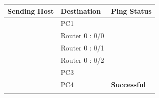 \documentclass[a4paper,11pt]{article}
\begin{document}
\begin{enumerate}
\begin{table}[H]
              \begin{tabular}{| m{10em}| m{15em}| m{10em} |}
                  \hline
                  \multicolumn{1}{|l|}{\textbf{Sending Host}}                     & \textbf{Destination} & \multicolumn{1}{l|}{\textbf{Ping Status}}                             \\
                  \hline
                  {\cellcolor[rgb]{0.141,0.525,1}}                                & PC1                  & {\cellcolor[rgb]{0.404,1,0.835}}                                      \\
                  \hhline{|>{\arrayrulecolor[rgb]{0.141,0.525,1}}->{\arrayrulecolor{black}}->{\arrayrulecolor[rgb]{0.404,1,0.835}}->{\arrayrulecolor{black}}|}
                  {\cellcolor[rgb]{0.141,0.525,1}}                                & Router 0 : 0/0       & {\cellcolor[rgb]{0.404,1,0.835}}                                      \\
                  \hhline{|>{\arrayrulecolor[rgb]{0.141,0.525,1}}->{\arrayrulecolor{black}}->{\arrayrulecolor[rgb]{0.404,1,0.835}}->{\arrayrulecolor{black}}|}
                  {\cellcolor[rgb]{0.141,0.525,1}}                                & Router 0 : 0/1       & {\cellcolor[rgb]{0.404,1,0.835}}                                      \\
                  \hhline{|>{\arrayrulecolor[rgb]{0.141,0.525,1}}->{\arrayrulecolor{black}}->{\arrayrulecolor[rgb]{0.404,1,0.835}}->{\arrayrulecolor{black}}|}
                  {\cellcolor[rgb]{0.141,0.525,1}}                                & Router 0 : 0/2       & {\cellcolor[rgb]{0.404,1,0.835}}                                      \\
                  \hhline{|>{\arrayrulecolor[rgb]{0.141,0.525,1}}->{\arrayrulecolor{black}}->{\arrayrulecolor[rgb]{0.404,1,0.835}}->{\arrayrulecolor{black}}|}
                  {\cellcolor[rgb]{0.141,0.525,1}}                                & PC3                  & {\cellcolor[rgb]{0.404,1,0.835}}                                      \\
                  \hhline{|>{\arrayrulecolor[rgb]{0.141,0.525,1}}->{\arrayrulecolor{black}}->{\arrayrulecolor[rgb]{0.404,1,0.835}}->{\arrayrulecolor{black}}|}
                  {\cellcolor[rgb]{0.141,0.525,1}}                                & PC4                  & \multirow{-6}{*}{{\cellcolor[rgb]{0.404,1,0.835}}\textbf{Successful}} \\
                  \hhline{|>{\arrayrulecolor[rgb]{0.141,0.525,1}}->{\arrayrulecolor{black}}--|}

\end{tabular}
\end{table}
\end{enumerate}
\end{document}
